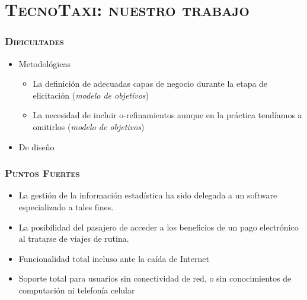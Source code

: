 
\begin{frame}[t,plain]
\titlepage
\end{frame}

\watermarkoff

\section{\textsc{TecnoTaxi: nuestro trabajo}}


\begin{frame}
\frametitle{\textsc{Dificultades}}
\begin{itemize}
\item Metodológicas
\begin{itemize}
\item La definición de adecuadas capas de negocio durante la etapa de elicitación (\emph{modelo de objetivos})
\item La necesidad de incluir o-refinamientos aunque en la práctica tendíamos a omitirlos (\emph{modelo de objetivos})
\end{itemize}
\item De diseño
\end{itemize}
\end{frame}


\begin{frame}
\frametitle{\textsc{Puntos Fuertes}}

\begin{itemize}
\item La gestión de la información estadística ha sido delegada a un software especializado a tales fines. 
\item La posibilidad del pasajero de acceder a los beneficios de un pago electrónico al tratarse de viajes de rutina.
\item Funcionalidad total incluso ante la ca\'ida de Internet
\item Soporte total para usuarios sin conectividad de red, o sin conocimientos de computaci\'on ni telefon\'ia celular
\end{itemize}
\end{frame}

